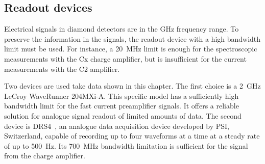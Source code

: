 \subsection{Readout devices}
\label{sec:readoutdev}
Electrical signals in diamond detectors are in the GHz frequency range. To preserve the information in the signals, the readout device with a high bandwidth limit must be used. For instance, a 20~MHz limit is enough for the spectroscopic measurements with the Cx charge amplifier, but is insufficient for the current measurements with the C2 amplifier. 

Two devices are used take data shown in this chapter. The first choice is a 2~GHz LeCroy WaveRunner 204MXi-A. This specific model has a sufficiently high bandwidth limit for the fast current preamplifier signals. It offers a reliable solution for analogue signal readout of limited amounts of data. 
The second device is DRS4~\cite{DRS4:00000}, an analogue data acquisition device developed by PSI, Switzerland, capable of recording up to four waveforms at a time at a steady rate of up to 500~Hz. Its 700~MHz bandwidth limitation is sufficient for the signal from the charge amplifier.



